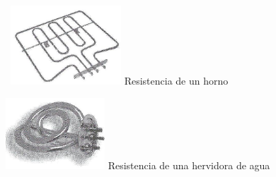 \documentclass[a5paper,twoside,openany]{book}
\begin{document}
\begin{figure}[h]
\noindent\begin{minipage}[t]{0.26\textwidth}\vspace{0pt}\
\includegraphics[width=\linewidth]{resistencia-horno}
Resistencia de un horno
\end{minipage}
\begin{minipage}[t]{0.26\textwidth}\vspace{0pt}
\includegraphics[width=\linewidth]{resistencia-hervidora-de-agua}
Resistencia de una hervidora de agua
\end{minipage}
\begin{minipage}[t]{0.26\textwidth}\vspace{\fill}

\end{minipage}
\end{figure}
\end{document}
